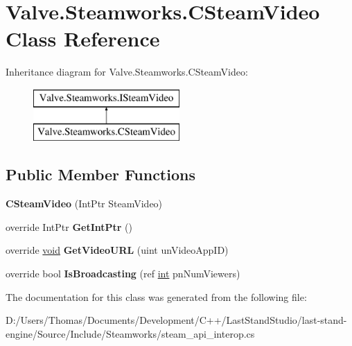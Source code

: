\hypertarget{classValve_1_1Steamworks_1_1CSteamVideo}{}\section{Valve.\+Steamworks.\+C\+Steam\+Video Class Reference}
\label{classValve_1_1Steamworks_1_1CSteamVideo}
Inheritance diagram for Valve.\+Steamworks.\+C\+Steam\+Video\+:\begin{figure}[H]
\begin{center}
\leavevmode
\includegraphics[height=2.000000cm]{classValve_1_1Steamworks_1_1CSteamVideo}
\end{center}
\end{figure}
\subsection*{Public Member Functions}
\begin{DoxyCompactItemize}
\item 
\hypertarget{classValve_1_1Steamworks_1_1CSteamVideo_a6568fe7dd8f57b8f9a4da7956c4ed2d7}{}{\bfseries C\+Steam\+Video} (Int\+Ptr Steam\+Video)\label{classValve_1_1Steamworks_1_1CSteamVideo_a6568fe7dd8f57b8f9a4da7956c4ed2d7}

\item 
\hypertarget{classValve_1_1Steamworks_1_1CSteamVideo_ac605dfbe9c48ca8a084149d4c12d6538}{}override Int\+Ptr {\bfseries Get\+Int\+Ptr} ()\label{classValve_1_1Steamworks_1_1CSteamVideo_ac605dfbe9c48ca8a084149d4c12d6538}

\item 
\hypertarget{classValve_1_1Steamworks_1_1CSteamVideo_aee288f527c38df5c59f4665f102cdb1e}{}override \hyperlink{SDL__audio_8h_a52835ae37c4bb905b903cbaf5d04b05f}{void} {\bfseries Get\+Video\+U\+R\+L} (uint un\+Video\+App\+I\+D)\label{classValve_1_1Steamworks_1_1CSteamVideo_aee288f527c38df5c59f4665f102cdb1e}

\item 
\hypertarget{classValve_1_1Steamworks_1_1CSteamVideo_a7ae8a4bdc7c9ba5e44dcb4dbcb8e2edc}{}override bool {\bfseries Is\+Broadcasting} (ref \hyperlink{SDL__thread_8h_a6a64f9be4433e4de6e2f2f548cf3c08e}{int} pn\+Num\+Viewers)\label{classValve_1_1Steamworks_1_1CSteamVideo_a7ae8a4bdc7c9ba5e44dcb4dbcb8e2edc}

\end{DoxyCompactItemize}


The documentation for this class was generated from the following file\+:\begin{DoxyCompactItemize}
\item 
D\+:/\+Users/\+Thomas/\+Documents/\+Development/\+C++/\+Last\+Stand\+Studio/last-\/stand-\/engine/\+Source/\+Include/\+Steamworks/steam\+\_\+api\+\_\+interop.\+cs\end{DoxyCompactItemize}
